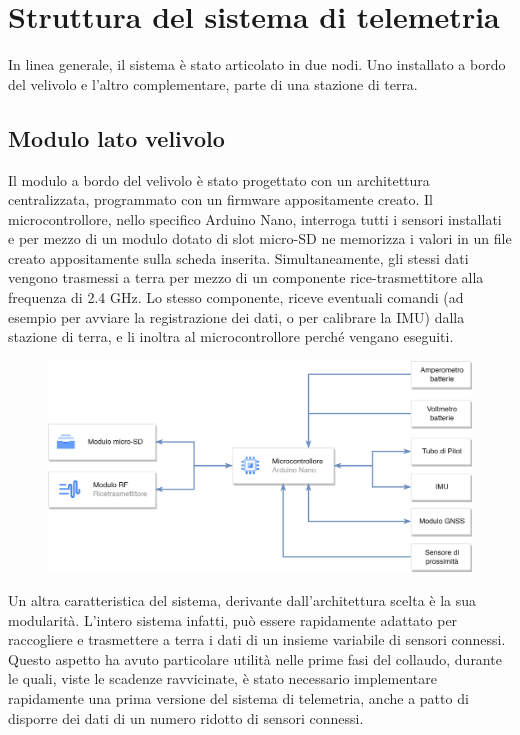 \documentclass[12pt]{article}
\begin{document}
\section*{Struttura del sistema di telemetria}
In linea generale, il sistema è stato articolato in due nodi. Uno installato a bordo del velivolo e l'altro complementare, parte di una stazione di terra.

\subsection*{Modulo lato velivolo}
Il modulo a bordo del velivolo è stato progettato con un architettura centralizzata, programmato con un firmware appositamente creato. Il microcontrollore, nello specifico Arduino Nano, interroga tutti i sensori installati e per mezzo di un modulo dotato di slot micro-SD ne memorizza i valori in un file creato appositamente sulla scheda inserita. Simultaneamente, gli stessi dati vengono trasmessi a terra per mezzo di un componente rice-trasmettitore alla frequenza di 2.4 GHz. Lo stesso componente, riceve eventuali comandi (ad esempio per avviare la registrazione dei dati, o per calibrare la IMU) dalla stazione di terra, e li inoltra al microcontrollore perché vengano eseguiti.

\begin{figure}[h]
	\centering
	\includegraphics[width=13cm]{img/RADAR-Arch}
\end{figure}

\noindent
Un altra caratteristica del sistema, derivante dall'architettura scelta è la sua modularità. L'intero sistema infatti, può essere rapidamente adattato per raccogliere e trasmettere a terra i dati di un insieme variabile di sensori connessi. Questo aspetto ha avuto particolare utilità nelle prime fasi del collaudo, durante le quali, viste le scadenze ravvicinate, è stato necessario implementare rapidamente una prima versione del sistema di telemetria, anche a patto di disporre dei dati di un numero ridotto di sensori connessi.
\end{document}
